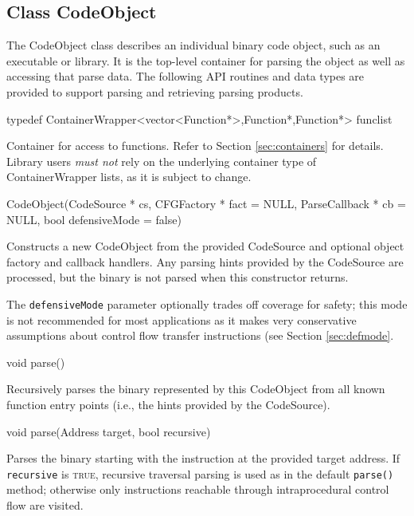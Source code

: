 \documentclass{article}
\newenvironment{apient}{\small\verbatim}{\endverbatim}
\newcommand{\apidesc}[1]{%
{\addtolength{\leftskip}{4em}%
#1\par\medskip}
}
\begin{document}
\subsection{Class CodeObject}

The CodeObject class describes an individual binary code object, such as an
executable or library. It is the top-level container for parsing the object as
well as accessing that parse data. The following API routines and data types
are provided to support parsing and retrieving parsing products.

\begin{apient}
typedef ContainerWrapper<vector<Function*>,Function*,Function*> funclist
\end{apient}
\apidesc{Container for access to functions. Refer to Section \ref{sec:containers} for details. Library users \emph{must not} rely on the underlying container type of ContainerWrapper lists, as it is subject to change.}

\begin{apient}
CodeObject(CodeSource * cs,
    CFGFactory * fact = NULL,
    ParseCallback * cb = NULL,
    bool defensiveMode = false)
\end{apient}
\apidesc{Constructs a new CodeObject from the provided CodeSource and
optional object factory and callback handlers. Any parsing hints provided
by the CodeSource are processed, but the binary is not parsed when this
constructor returns.

\medskip\noindent The \texttt{defensiveMode}
parameter optionally trades off coverage for safety; this mode is not
recommended for most applications as it makes very conservative assumptions
about control flow transfer instructions (see Section \ref{sec:defmode}.}

\begin{apient}
void parse()
\end{apient}
\apidesc{Recursively parses the binary represented by this CodeObject from all
known function entry points (i.e., the hints provided by the CodeSource).}

\begin{apient}
void parse(Address target, bool recursive)
\end{apient}
\apidesc{Parses the binary starting with the instruction at the provided target address. If \texttt{recursive} is {\scshape true}, recursive traversal parsing is used as in the default \texttt{parse()} method; otherwise only instructions reachable through intraprocedural control flow are visited.}
\end{document}
